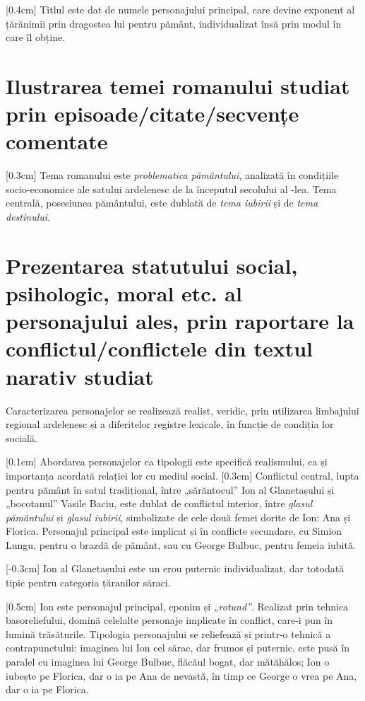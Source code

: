 [0.4cm]
Titlul este dat de numele personajului principal, care devine exponent al țărănimii prin dragostea lui pentru pământ, individualizat însă prin modul în care îl obține.


\section{Ilustrarea temei romanului studiat prin episoade/citate/sec\-ven\-țe comentate}

[0.3cm]
Tema romanului este \textit{problematica pământului}, analizată în condițiile socio-economice ale satului ardelenesc de la începutul secolului al -lea. Tema centrală, posesiunea pământului, este dublată de \textit{tema iubirii} și de \textit{tema destinului}.


\section{Prezentarea statutului social, psihologic, moral etc. al personajului ales, prin raportare la conflictul/conflictele din textul narativ studiat}

Caracterizarea personajelor se realizează realist, veridic, prin utilizarea limbajului regional ardelenesc și a diferitelor registre lexicale, în funcție de condiția lor socială.

[0.1cm]
Abordarea personajelor ca tipologii este specifică realismului, ca și importanța acordată relației lor cu mediul social.
[0.3cm]
Conflictul central, lupta pentru pământ în satul tradițional, între „sărăntocul” Ion al Glanetașului și „bocotanul” Vasile Baciu, este dublat de conflictul interior, între \textit{glasul pământului} și \textit{glasul iubirii}, simbolizate de cele două femei dorite de Ion: Ana și Florica. Personajul principal este implicat și în conflicte secundare, cu Simion Lungu, pentru o brazdă de pământ, sau cu George Bulbuc, pentru femeia iubită.

[-0.3cm]
Ion al Glanetașului este un erou puternic individualizat, dar totodată tipic pentru categoria țăranilor săraci.

[0.5cm]
Ion este personajul principal, eponim și \textit{„rotund”}. Realizat prin tehnica basoreliefului, domină celelalte personaje implicate în conflict, care-i pun în lumină trăsăturile. Tipologia personajului se reliefează și printr-o tehnică a contrapunctului: imaginea lui Ion cel sărac, dar frumos și puternic, este pusă în paralel cu imaginea lui George Bulbuc, flăcăul bogat, dar mătăhălos; Ion o iubește pe Florica, dar o ia pe Ana de nevastă, în timp ce George o vrea pe Ana, dar o ia pe Florica.

